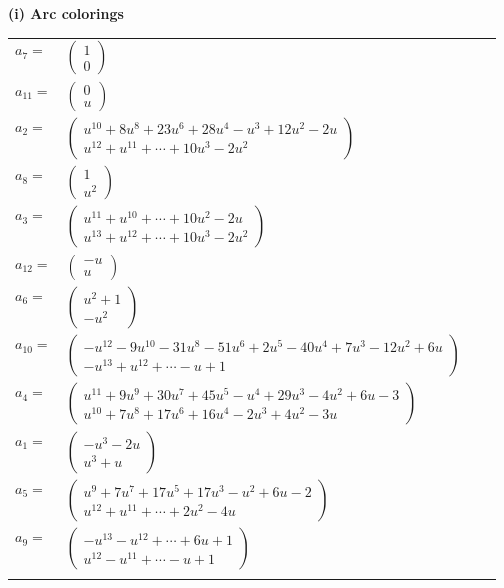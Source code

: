\documentclass[1p]{elsarticle_modified}
\theoremstyle{definition}
\begin{document}
\flushleft \textbf{(i) Arc colorings}\\
\begin{tabular}{m{7pt} m{180pt} m{7pt} m{180pt} }
\flushright $a_{7}=$&$\begin{pmatrix}1\\0\end{pmatrix}$ \\
\flushright $a_{11}=$&$\begin{pmatrix}0\\u\end{pmatrix}$ \\
\flushright $a_{2}=$&$\begin{pmatrix}u^{10}+8 u^8+23 u^6+28 u^4- u^3+12 u^2-2 u\\u^{12}+u^{11}+\cdots+10 u^3-2 u^2\end{pmatrix}$ \\
\flushright $a_{8}=$&$\begin{pmatrix}1\\u^2\end{pmatrix}$ \\
\flushright $a_{3}=$&$\begin{pmatrix}u^{11}+u^{10}+\cdots+10 u^2-2 u\\u^{13}+u^{12}+\cdots+10 u^3-2 u^2\end{pmatrix}$ \\
\flushright $a_{12}=$&$\begin{pmatrix}- u\\u\end{pmatrix}$ \\
\flushright $a_{6}=$&$\begin{pmatrix}u^2+1\\- u^2\end{pmatrix}$ \\
\flushright $a_{10}=$&$\begin{pmatrix}- u^{12}-9 u^{10}-31 u^8-51 u^6+2 u^5-40 u^4+7 u^3-12 u^2+6 u\\- u^{13}+u^{12}+\cdots- u+1\end{pmatrix}$ \\
\flushright $a_{4}=$&$\begin{pmatrix}u^{11}+9 u^9+30 u^7+45 u^5- u^4+29 u^3-4 u^2+6 u-3\\u^{10}+7 u^8+17 u^6+16 u^4-2 u^3+4 u^2-3 u\end{pmatrix}$ \\
\flushright $a_{1}=$&$\begin{pmatrix}- u^3-2 u\\u^3+u\end{pmatrix}$ \\
\flushright $a_{5}=$&$\begin{pmatrix}u^9+7 u^7+17 u^5+17 u^3- u^2+6 u-2\\u^{12}+u^{11}+\cdots+2 u^2-4 u\end{pmatrix}$ \\
\flushright $a_{9}=$&$\begin{pmatrix}- u^{13}- u^{12}+\cdots+6 u+1\\u^{12}- u^{11}+\cdots- u+1\end{pmatrix}$\\&\end{tabular}
\end{document}

